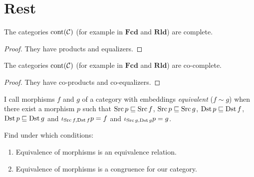\section{Rest}

\begin{thm}
  The categories $\operatorname{cont} (\mathcal{C})$ (for example in
  $\mathbf{Fcd}$ and $\mathbf{Rld}$) are complete.
\end{thm}

\begin{proof}
  They have products and equalizers.
\end{proof}

\begin{thm}
  The categories $\operatorname{cont} (\mathcal{C})$ (for example in
  $\mathbf{Fcd}$ and $\mathbf{Rld}$) are co-complete.
\end{thm}

\begin{proof}
  They have co-products and co-equalizers.
\end{proof}

\begin{defn}
  I call morphisms $f$ and $g$ of a category with embeddings
  \emph{equivalent} ($f \sim g$) when there exist a morphism $p$ such that
  $\operatorname{Src} p \sqsubseteq \operatorname{Src} f$, $\operatorname{Src} p \sqsubseteq
  \operatorname{Src} g$, $\operatorname{Dst} p \sqsubseteq \operatorname{Dst} f$, $\operatorname{Dst} p
  \sqsubseteq \operatorname{Dst} g$ and $\iota_{\operatorname{Src} f, \operatorname{Dst} f} p = f$ and
  $\iota_{\operatorname{Src} g, \operatorname{Dst} g} p = g$.
\end{defn}

\begin{problem}
  Find under which conditions:
  \begin{enumerate}
    \item Equivalence of morphisms is an equivalence relation.
    
    \item Equivalence of morphisms is a congruence for our category.
  \end{enumerate}
\end{problem}